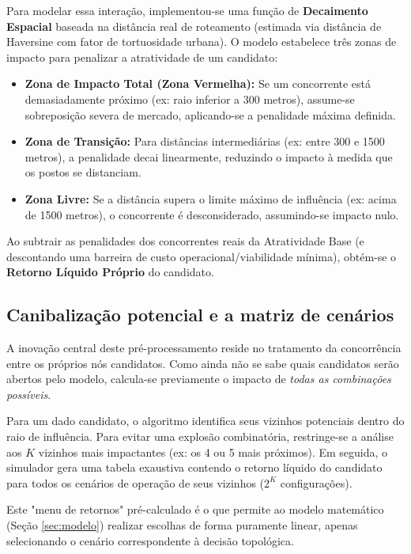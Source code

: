 Para modelar essa interação, implementou-se uma função de \textbf{Decaimento Espacial} baseada na distância real de roteamento (estimada via distância de Haversine com fator de tortuosidade urbana). O modelo estabelece três zonas de impacto para penalizar a atratividade de um candidato:

\begin{itemize}
    \item \textbf{Zona de Impacto Total (Zona Vermelha):} Se um concorrente está demasiadamente próximo (ex: raio inferior a 300 metros), assume-se sobreposição severa de mercado, aplicando-se a penalidade máxima definida.
    \item \textbf{Zona de Transição:} Para distâncias intermediárias (ex: entre 300 e 1500 metros), a penalidade decai linearmente, reduzindo o impacto à medida que os postos se distanciam.
    \item \textbf{Zona Livre:} Se a distância supera o limite máximo de influência (ex: acima de 1500 metros), o concorrente é desconsiderado, assumindo-se impacto nulo.
\end{itemize}

Ao subtrair as penalidades dos concorrentes reais da Atratividade Base (e descontando uma barreira de custo operacional/viabilidade mínima), obtém-se o \textbf{Retorno Líquido Próprio} do candidato.

\subsection{Canibalização potencial e a matriz de cenários}

A inovação central deste pré-processamento reside no tratamento da concorrência entre os próprios nós candidatos. Como ainda não se sabe quais candidatos serão abertos pelo modelo, calcula-se previamente o impacto de \textit{todas as combinações possíveis}.

Para um dado candidato, o algoritmo identifica seus vizinhos potenciais dentro do raio de influência. Para evitar uma explosão combinatória, restringe-se a análise aos $K$ vizinhos mais impactantes (ex: os 4 ou 5 mais próximos). Em seguida, o simulador gera uma tabela exaustiva contendo o retorno líquido do candidato para todos os cenários de operação de seus vizinhos ($2^K$ configurações). 

Este "menu de retornos" pré-calculado é o que permite ao modelo matemático (Seção \ref{sec:modelo}) realizar escolhas de forma puramente linear, apenas selecionando o cenário correspondente à decisão topológica.

